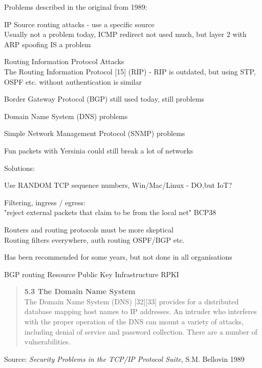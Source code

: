 \documentclass[Screen16to9,17pt]{foils}
\begin{document}

\begin{list1}
\item Problems described in the original from 1989:
\begin{list2}
\item IP Source routing attacks - use a specific source\\
Usually not a problem today, ICMP redirect not used much, but layer 2 with ARP spoofing IS a problem
\item Routing Information Protocol Attacks\\
The Routing Information Protocol [15] (RIP) - RIP is outdated, but using STP, OSPF etc. without authentication is similar
\item Border Gateway Protocol (BGP) still used today, still problems
\item Domain Name System (DNS) problems
\item Simple Network Management Protocol (SNMP) problems
\end{list2}
\vskip 1cm
\item Fun packets with Yersinia could still break a lot of networks 
\end{list1}


\begin{list1}
\item Solutions:
\begin{list2}
\item Use RANDOM TCP sequence numbers, Win/Mac/Linux - DO,but IoT?
\item Filtering, ingress / egress:\\
"reject external packets that claim to be from the local net" BCP38
\item Routers and routing protocols must be more skeptical\\
Routing filters everywhere, auth routing OSPF/BGP etc.
\end{list2}
\item Has been recommended for some years, but not done in all organisations
\item BGP routing Resource Public Key Infrastructure RPKI
\end{list1}


\begin{quote}
{\bf 5.3 The Domain Name System}\\
The Domain Name System (DNS) [32][33] provides for a distributed database mapping host names to IP addresses. An intruder who interferes with the proper operation of the DNS can mount a variety of attacks, including denial of service and password collection. There are a number of vulnerabilities.
\end{quote}
Source: \emph{Security Problems in the TCP/IP Protocol Suite}, S.M. Bellovin 1989\\
\end{document}
